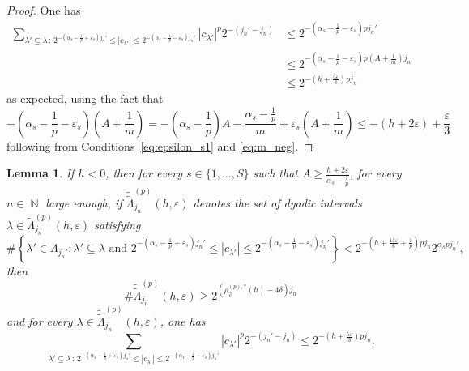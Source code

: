\documentclass[a4paper,11pt,oneside]{article}
\DeclareMathOperator{\N}{\mathbb{N}}
\newcommand{\modu}[1]{\left\vert{#1}\right\vert}
\theoremstyle{definition}
\theoremstyle{plain}
\newtheorem{lemma}[defi]{Lemma}
\begin{document}
\begin{proof}
    One has
    \begin{align*}
        \sum_{\lambda'\subseteq\lambda \,:\, 2^{-\left(\alpha_s-\frac{1}{p}+\varepsilon_s\right)j_n'} \leq \modu{c_{\lambda'}} \leq 2^{-\left(\alpha_s-\frac{1}{p}-\varepsilon_s\right)j_n'}} \modu{c_{\lambda'}}^p2^{-(j_n'-j_n)}
        & \leq 2^{-\left(\alpha_s-\frac{1}{p}-\varepsilon_s\right)pj_n'} \\
        & \leq 2^{-\left(\alpha_s-\frac{1}{p}-\varepsilon_s\right)p\left(A+\frac{1}{m}\right)j_n} \\
        & \leq 2^{-\left(h+\frac{5\varepsilon}{3}\right)pj_n}
    \end{align*}
    as expected, using the fact that
    \[
    -\left(\alpha_s-\frac{1}{p}-\varepsilon_s\right)\left(A+\frac{1}{m}\right) = -\left(\alpha_s-\frac{1}{p}\right)A-\frac{\alpha_s-\frac{1}{p}}{m}+\varepsilon_s\left(A+\frac{1}{m}\right) \leq -(h+2\varepsilon)+\frac{\varepsilon}{3}
    \]
    following from Conditions~\eqref{eq:epsilon_s1} and \eqref{eq:m_neg}.
\end{proof}

\begin{lemma}\label{lm:rid_order2}
    If $h<0$, then for every $s\in\{1,\ldots,S\}$ such that $A\geq\frac{h+2\varepsilon}{\alpha_s-\frac{1}{p}}$, for every $n\in\N$ large enough, if $\widetilde{\widetilde{\Lambda}}_{j_n}^{(p)}(h,\varepsilon)$ denotes the set of dyadic intervals $\lambda\in\widetilde{\Lambda}_{j_n}^{(p)}(h,\varepsilon)$ satisfying
    \[
    \#\left\{\lambda'\in\Lambda_{j_n'}:\lambda'\subseteq\lambda  \text{ and } 2^{-\left(\alpha_s-\frac{1}{p}+\varepsilon_s\right)j_n'} \leq \modu{c_{\lambda'}} \leq 2^{-\left(\alpha_s-\frac{1}{p}-\varepsilon_s\right)j_n'}\right\}<2^{-\left(h+\frac{11\varepsilon}{6}+\frac{1}{p}\right)pj_n}2^{\alpha_spj_n'},
    \]
    then
    \[
    \#\widetilde{\widetilde{\Lambda}}_{j_n}^{(p)}(h,\varepsilon) \geq 2^{\left(\rho_{\vec{c}}^{(p),\ast}(h)-4\delta\right)j_n}
    \]
    and for every $\lambda\in\widetilde{\widetilde{\Lambda}}_{j_n}^{(p)}(h,\varepsilon)$, one has
    \[
    \sum_{\lambda'\subseteq\lambda \,:\, 2^{-\left(\alpha_s-\frac{1}{p}+\varepsilon_s\right)j_n'} \leq \modu{c_{\lambda'}} \leq 2^{-\left(\alpha_s-\frac{1}{p}-\varepsilon_s\right)j_n'}} \modu{c_{\lambda'}}^p2^{-(j_n'-j_n)} \leq 2^{-\left(h+\frac{5\varepsilon}{3}\right)pj_n}.
    \]
\end{lemma}
\end{document}
